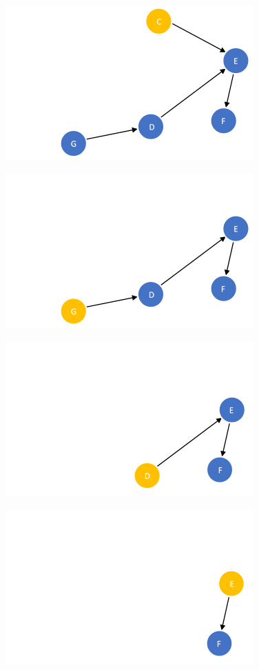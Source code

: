 \documentclass{article}
\begin{document}
\begin{figure}[H]
\centering
\includegraphics[scale=0.6]{images/Q6/03.png}
\end{figure}

\begin{figure}[H]
\centering
\includegraphics[scale=0.6]{images/Q6/04.png}
\end{figure}

\begin{figure}[H]
\centering
\includegraphics[scale=0.6]{images/Q6/05.png}
\end{figure}

\begin{figure}[H]
\centering
\includegraphics[scale=0.6]{images/Q6/06.png}
\end{figure}
\end{document}
